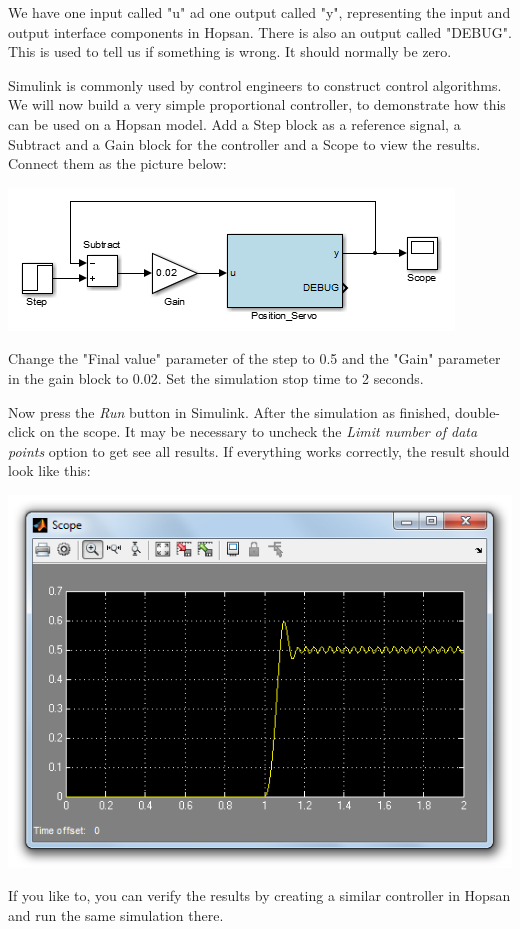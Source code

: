 \documentclass[a4paper]{article}
\begin{document}
\begin{enumerate}
We have one input called "u" ad one output called "y", representing the input and output interface components in Hopsan.
There is also an output called "DEBUG".
This is used to tell us if something is wrong.
It should normally be zero.

Simulink is commonly used by control engineers to construct control algorithms. 
We will now build a very simple proportional controller, to demonstrate how this can be used on a Hopsan model.
Add a Step block as a reference signal, a Subtract and a Gain block for the controller and a Scope to view the results.
Connect them as the picture below:

\includegraphics{gfx/simulink/simulinkfeedback.png}

Change the "Final value" parameter of the step to 0.5 and the "Gain" parameter in the gain block to 0.02. Set the simulation stop time to 2 seconds.

Now press the \textit{Run} button in Simulink. After the simulation as finished, double-click on the scope. It may be necessary to uncheck the \textit{Limit number of data points} option to get see all results. If everything works correctly, the result should look like this:

\includegraphics[width=0.6\linewidth]{gfx/simulink/simulinkplot.png}

If you like to, you can verify the results by creating a similar controller in Hopsan and run the same simulation there.


\end{enumerate}
\end{document}
